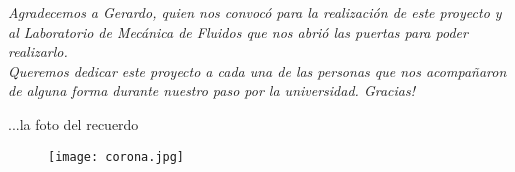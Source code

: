 	
	\vspace{6cm}

 
		\begin{flushright}
	\textit{	Agradecemos a Gerardo, quien nos convocó para la realización de este proyecto y al Laboratorio de Mecánica de Fluidos que nos abrió las puertas para poder realizarlo.}\\
		\vspace{3cm}
	\textit{	Queremos dedicar este proyecto a cada una de las personas que nos acompañaron de alguna forma durante nuestro paso por la universidad. Gracias!}
		\end{flushright}

	
	
		

\newpage
\vspace*{6cm}
\begin{flushright}
	...la foto del recuerdo
\end{flushright}
	
\begin{figure}[htb]
	\centering
	\texttt{[image: corona.jpg]}
	\label{fig:corona}
\end{figure}


\newpage
